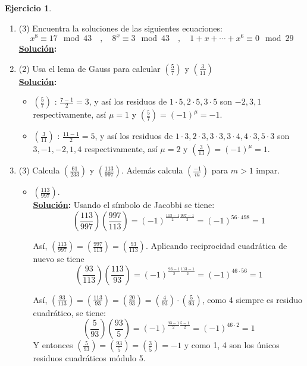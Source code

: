 \documentclass[11pt,letterpaper]{article}
\theoremstyle{definition}\newtheorem{p}{Ejercicio}
\newcommand{\leg}[2]{\left( \frac{#1}{#2}\right)} %
\newcommand{\sol}{\textbf{\underline{Solución}: }} %
\begin{document}
\begin{p}
\begin{enumerate}
  \item(3) Encuentra la soluciones de las siguientes ecuaciones:
  \[
    x^8\equiv 17 \mod 43 \quad,\quad 8^x\equiv 3\mod 43 \quad,\quad 1+x+\cdots+x^6\equiv 0\mod 29
  \]
  \sol

  \item(2) Usa el lema de Gauss para calcular $\left(\frac{5}{7}\right)$ y $\left(\frac{3}{11}\right)$\\
  \sol
  \begin{itemize}
    \item $\left(\frac{5}{7}\right)$ : $\frac{7-1}{2} = 3$, y así los residuos de
    $1 \cdot 5, 2 \cdot 5, 3 \cdot 5$ son $-2,3,1$ respectivamente, así $\mu = 1$ y 
    $\left(\frac{5}{7}\right) = \left( -1 \right)^{\mu} = -1$.

    \item $\left(\frac{3}{11}\right)$ : $\frac{11-1}{2} = 5$, y así los residuos de
    $1 \cdot 3, 2 \cdot 3, 3 \cdot 3, 3 \cdot 4, 4 \cdot 3, 5 \cdot 3$ son $3,-1,-2,1,4$
    respectivamente, así $\mu = 2$ y $\left(\frac{3}{13}\right) = \left( -1 \right)^{\mu} = 1$.
  \end{itemize}
  
  \item(3) Calcula $\left(\frac{61}{233}\right)$ y $\left(\frac{113}{997}\right)$.
  Adem\'as calcula $\leg{-1}{m}$ para $m>1$ impar.
  \begin{itemize}
    \item $\left(\frac{113}{997}\right)$.\\
    \sol Usando el símbolo de Jacobbi se tiene:
    $$\left(\frac{113}{997}\right) \left(\frac{997}{113}\right) = 
    (-1)^{\frac{113-1}{2} \frac{997-1}{2}} = (-1)^{56 \cdot 498} = 1$$

    Así, $\left(\frac{113}{997}\right) = \left(\frac{997}{113}\right) = \left(\frac{93}{113}\right)$.
    Aplicando reciprocidad cuadrática de nuevo se tiene
    $$\left(\frac{93}{113}\right) \left(\frac{113}{93}\right) = 
    (-1)^{\frac{93-1}{2} \frac{113-1}{2}} = (-1)^{46 \cdot 56} = 1$$

    Así, $\left(\frac{93}{113}\right) = \left(\frac{113}{93}\right) = \left(\frac{20}{93}\right) 
    = \left(\frac{4}{93}\right) \cdot \left(\frac{5}{93}\right)$,
    como 4 siempre es residuo cuadrático, se tiene:
    $$\left(\frac{5}{93}\right) \left(\frac{93}{5}\right) = 
    (-1)^{\frac{93-1}{2} \frac{5-1}{2}} = (-1)^{46 \cdot 2} = 1$$
    Y entonces $\left(\frac{5}{93}\right) = \left(\frac{93}{5}\right) = \left(\frac{3}{5}\right) =
    -1$ y como 1, 4 son los únicos residuos cuadráticos módulo 5.


\end{itemize}
\end{enumerate}
\end{p}
\end{document}
